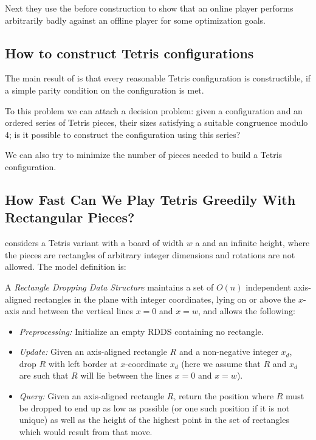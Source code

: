 Next they use the before construction to show that an online player performs arbitrarily badly against an offline player for some optimization goals.

\subsection{How to construct Tetris configurations}

The main result of \cite{HTCT} is that every reasonable Tetris configuration is constructible, if a simple parity condition on the configuration is met.

To this problem we can attach a decision problem: given a configuration and an ordered series of Tetris pieces, their sizes satisfying a suitable congruence modulo 4; is it possible to construct the configuration using this series? 

We can also try to minimize the number of pieces needed to build a Tetris configuration.

\subsection{How Fast Can We Play Tetris Greedily With Rectangular Pieces?}

\cite{TWRP} considers a Tetris variant with a board of width $w$ a and an infinite height, where the pieces are rectangles of arbitrary integer dimensions and rotations are not allowed. The model definition is:

\begin{definition}[RDDS]
  A \emph{Rectangle Dropping Data Structure} maintains a set of $O(n)$ independent axis-aligned rectangles in the plane with integer coordinates, lying on or above the $x$-axis and between the vertical lines $x = 0$ and $x = w$, and allows the following:

  \begin{itemize}
    \item \emph{Preprocessing:} Initialize an empty RDDS containing no rectangle.
    \item \emph{Update:} Given an axis-aligned rectangle $R$ and a non-negative integer $x_d$, drop $R$ with left border at $x$-coordinate $x_d$ (here we assume that $R$ and $x_d$ are such that $R$ will lie between the lines $x = 0$ and $x = w$).
    \item \emph{Query:} Given an axis-aligned rectangle $R$, return the position where $R$ must be dropped to end up as low as possible (or one such position if it is not unique) as well as the height of the highest point in the set of rectangles which would result from that move.
  \end{itemize}
\end{definition}

